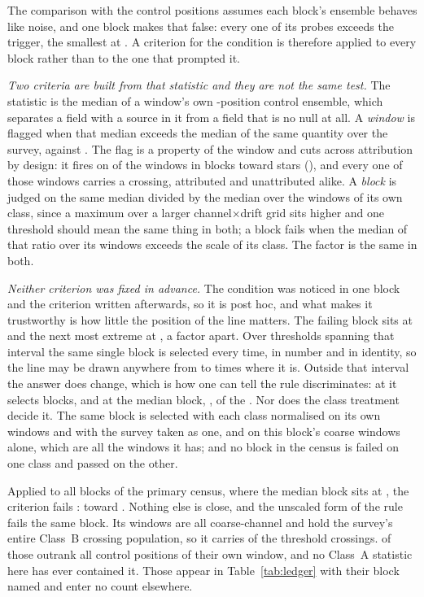 The comparison with the control positions assumes each block's ensemble
behaves like noise, and one block makes that false: every one of its \NCtrl{}
probes exceeds the trigger, the smallest at \BqFailCtrlMin. A criterion for
the condition is therefore applied to every block rather than to the one that
prompted it.

\emph{Two criteria are built from that statistic and they are not the same
test.} The statistic is the median of a window's own \NCtrl-position control
ensemble, which separates a field with a source in it from a field that is no
null at all. A \emph{window} is flagged when that median exceeds \BqFactor{}
the median of the same quantity over the survey, \DqThresh{} against
\DqSurvMed. The flag is a property of the window and cuts across attribution
by design: it fires on \DqNWin{} of the \NWindows{} windows in
\BkFlagNBlock{} blocks toward \DqNStar{} stars (\DqStars), and every one of
those windows carries a crossing, attributed and unattributed alike. A
\emph{block} is judged on the same median divided by the median over the
windows of its own class, since a maximum over a larger
channel$\times$drift grid sits higher and one threshold should mean the same
thing in both; a block fails when the median of that ratio over its windows
exceeds \BqFactor{} the scale of its class. The factor is the same in
both.

\emph{Neither criterion was fixed in advance.} The condition was noticed in
one block and the criterion written afterwards, so it is post hoc, and what
makes it trustworthy is how little the position of the line matters. The
failing block sits at \BqFailQ{} and the next most extreme at \BqNextQ, a
factor \QsRatio{} apart. Over \QsNStep{} thresholds spanning that interval
the same single block is selected every time, in number and in identity, so
the line may be drawn anywhere from \QsMarginLo{} to \QsMarginHi{} times
where it is. Outside that interval the answer does change, which is how one
can tell the rule discriminates: at \BqNextQ{} it selects \QsNAtNext{}
blocks, and at the median block, \QsQMed, \QsNAtMed{} of the
\BqNBlocks. Nor does the class treatment decide it. The same block is
selected with each class normalised on its own windows and with the survey
taken as one, and on this block's \QsFailNWinB{} coarse windows alone, which
are all the windows it has; and no block in the census is failed on one class
and passed on the other.

Applied to all \BqNBlocks{} blocks of the primary census, where the median
block sits at \BqQMed, the criterion fails \BqNFail: \BqFailBlock{} toward
\BqFailStar. Nothing else is close, and the unscaled form of the rule fails
the same \BqRawNFail{} block. Its \BqFailNWin{} windows are all
coarse-channel and
hold the survey's entire Class~B crossing population, so it carries
\EvNCrossFlag{} of the \EvNCrossRaw{} threshold crossings. \EvNRankFlag{}
of those outrank all \NCtrl{} control positions of their own window, and
no Class~A statistic here has ever contained it. Those \EvNCrossFlag{} appear
in Table~\ref{tab:ledger} with their block named and enter no count
elsewhere.

